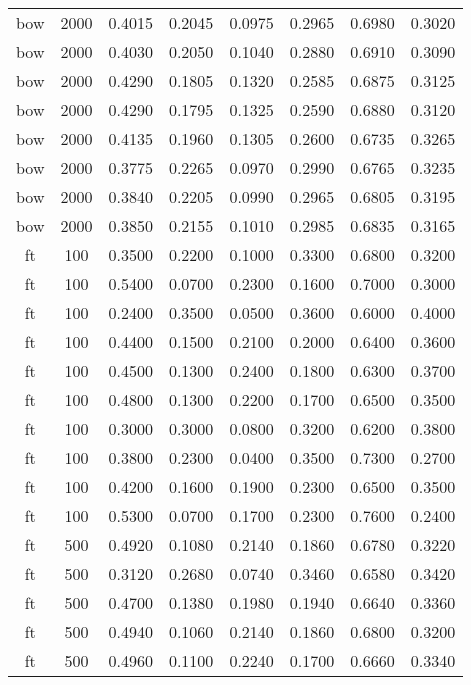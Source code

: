 \begin{scriptsize}
\begin{longtable}{cccccccc}
		bow      & 2000 & 0.4015 & 0.2045 & 0.0975 & 0.2965 & 0.6980 & 0.3020 \\
		bow      & 2000 & 0.4030 & 0.2050 & 0.1040 & 0.2880 & 0.6910 & 0.3090 \\
		bow      & 2000 & 0.4290 & 0.1805 & 0.1320 & 0.2585 & 0.6875 & 0.3125 \\
		bow      & 2000 & 0.4290 & 0.1795 & 0.1325 & 0.2590 & 0.6880 & 0.3120 \\
		bow      & 2000 & 0.4135 & 0.1960 & 0.1305 & 0.2600 & 0.6735 & 0.3265 \\
		bow      & 2000 & 0.3775 & 0.2265 & 0.0970 & 0.2990 & 0.6765 & 0.3235 \\
		bow      & 2000 & 0.3840 & 0.2205 & 0.0990 & 0.2965 & 0.6805 & 0.3195 \\
		bow      & 2000 & 0.3850 & 0.2155 & 0.1010 & 0.2985 & 0.6835 & 0.3165 \\
		ft       & 100  & 0.3500 & 0.2200 & 0.1000 & 0.3300 & 0.6800 & 0.3200 \\
		ft       & 100  & 0.5400 & 0.0700 & 0.2300 & 0.1600 & 0.7000 & 0.3000 \\
		ft       & 100  & 0.2400 & 0.3500 & 0.0500 & 0.3600 & 0.6000 & 0.4000 \\
		ft       & 100  & 0.4400 & 0.1500 & 0.2100 & 0.2000 & 0.6400 & 0.3600 \\
		ft       & 100  & 0.4500 & 0.1300 & 0.2400 & 0.1800 & 0.6300 & 0.3700 \\
		ft       & 100  & 0.4800 & 0.1300 & 0.2200 & 0.1700 & 0.6500 & 0.3500 \\
		ft       & 100  & 0.3000 & 0.3000 & 0.0800 & 0.3200 & 0.6200 & 0.3800 \\
		ft       & 100  & 0.3800 & 0.2300 & 0.0400 & 0.3500 & 0.7300 & 0.2700 \\
		ft       & 100  & 0.4200 & 0.1600 & 0.1900 & 0.2300 & 0.6500 & 0.3500 \\
		ft       & 100  & 0.5300 & 0.0700 & 0.1700 & 0.2300 & 0.7600 & 0.2400 \\
		ft       & 500  & 0.4920 & 0.1080 & 0.2140 & 0.1860 & 0.6780 & 0.3220 \\
		ft       & 500  & 0.3120 & 0.2680 & 0.0740 & 0.3460 & 0.6580 & 0.3420 \\
		ft       & 500  & 0.4700 & 0.1380 & 0.1980 & 0.1940 & 0.6640 & 0.3360 \\
		ft       & 500  & 0.4940 & 0.1060 & 0.2140 & 0.1860 & 0.6800 & 0.3200 \\
		ft       & 500  & 0.4960 & 0.1100 & 0.2240 & 0.1700 & 0.6660 & 0.3340 \\

\end{longtable}
\end{scriptsize}
